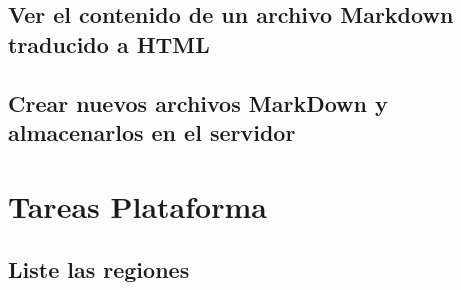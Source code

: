 \documentclass{article}
\begin{document}
	\subsection{Ver el contenido de un archivo Markdown traducido a HTML}
	\subsection{Crear nuevos archivos MarkDown y almacenarlos en el servidor}


	\clearpage

	\section{Tareas Plataforma}
	\subsection{Liste las regiones}
\end{document}
